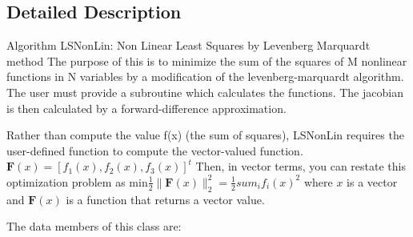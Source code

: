 \subsection{Detailed Description}
Algorithm L\-S\-Non\-Lin\-: Non Linear Least Squares by Levenberg Marquardt method The purpose of this is to minimize the sum of the squares of M nonlinear functions in N variables by a modification of the levenberg-\/marquardt algorithm. The user must provide a subroutine which calculates the functions. The jacobian is then calculated by a forward-\/difference approximation.

Rather than compute the value f(x) (the sum of squares), L\-S\-Non\-Lin requires the user-\/defined function to compute the vector-\/valued function. $ \textbf{F}(x) = [f_1(x), f_2(x), f_3(x)]^{t} $ Then, in vector terms, you can restate this optimization problem as $ \mbox{min} \frac{1}{2} \| \textbf{F}(x) \|_2^2 = \frac{1}{2} sum_i f_i(x)^2 $ where $x$ is a vector and $\textbf{F}(x)$ is a function that returns a vector value.

The data members of this class are\-:



